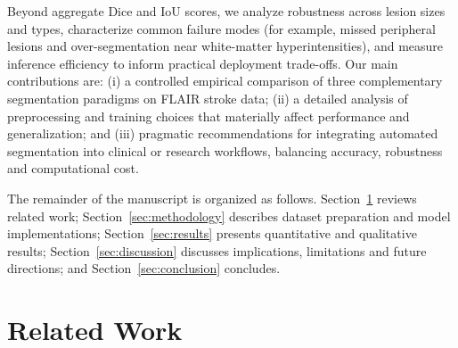 \documentclass[12pt]{article}
\begin{document}
Beyond aggregate Dice and IoU scores, we analyze robustness across lesion sizes and types, characterize common failure modes (for example, missed peripheral lesions and over-segmentation near white-matter hyperintensities), and measure inference efficiency to inform practical deployment trade-offs. Our main contributions are: (i) a controlled empirical comparison of three complementary segmentation paradigms on FLAIR stroke data; (ii) a detailed analysis of preprocessing and training choices that materially affect performance and generalization; and (iii) pragmatic recommendations for integrating automated segmentation into clinical or research workflows, balancing accuracy, robustness and computational cost.

The remainder of the manuscript is organized as follows. Section~\ref{sec:relatedwork} reviews related work; Section~\ref{sec:methodology} describes dataset preparation and model implementations; Section~\ref{sec:results} presents quantitative and qualitative results; Section~\ref{sec:discussion} discusses implications, limitations and future directions; and Section~\ref{sec:conclusion} concludes.

\section{Related Work} 
\label{sec:relatedwork}
\end{document}

